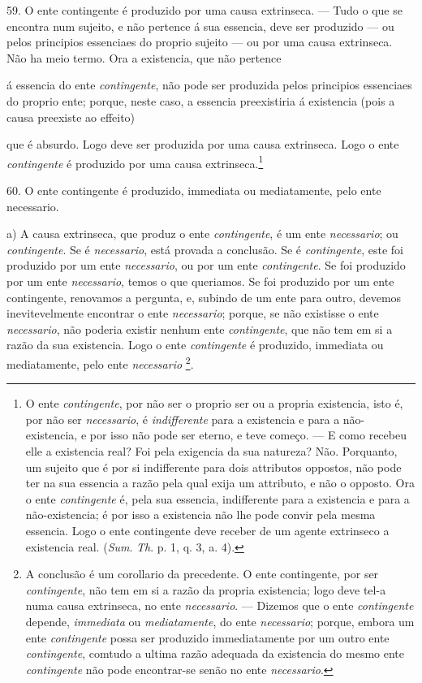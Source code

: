 59. O ente contingente é produzido por uma causa extrinseca. --- Tudo o que se encontra num sujeito, e não pertence á sua essencia, deve ser produzido --- ou pelos principios essenciaes do proprio sujeito --- ou por uma causa extrinseca. Não ha meio termo. Ora a existencia, que não pertence

á essencia do ente \emph{contingente}, não pode ser produzida pelos principios essenciaes do proprio ente; porque, neste caso, a essencia preexistiria á existencia (pois a causa preexiste ao effeito)

que é absurdo. Logo deve ser produzida por uma causa extrinseca. Logo o ente \emph{contingente} é produzido por uma causa extrinseca.\footnote{O ente \emph{contingente}, por não ser o proprio ser ou a propria existencia, isto é, por não ser \emph{necessario}, é \emph{indifferente} para a existencia e para a não-existencia, e por isso não pode ser eterno, e teve começo. --- E como recebeu elle a existencia real? Foi pela exigencia da sua natureza? Não. Porquanto, um sujeito que é por si indifferente para dois attributos oppostos, não pode ter na sua essencia a razão pela qual exija um attributo, e não o opposto. Ora o ente \emph{contingente} é, pela sua essencia, indifferente para a existencia e para a não-existencia; é por isso a existencia não lhe pode convir pela mesma essencia. Logo o ente contingente deve receber de um agente extrinseco a existencia real. (\emph{Sum}. \emph{Th}. p. 1, q. 3, a. 4).}

 60. O ente contingente é produzido, immediata ou mediatamente, pelo ente necessario.

a) A causa extrinseca, que produz o ente \emph{contingente}, é um ente \emph{necessario}; ou \emph{contingente}. Se é \emph{necessario}, está provada a conclusão. Se é \emph{contingente}, este foi produzido por um ente \emph{necessario}, ou por um ente \emph{contingente}. Se foi produzido por um ente \emph{necessario}, temos o que queriamos. Se foi produzido por um ente contingente, renovamos a pergunta, e, subindo de um ente para outro, devemos inevitevelmente encontrar o ente \emph{necessario}; porque, se não existisse o ente \emph{necessario}, não poderia existir nenhum ente \emph{contingente}, que não tem em si a razão da sua existencia. Logo o ente \emph{contingente} é produzido, immediata ou mediatamente, pelo ente \emph{necessario} \footnote{A conclusão é um corollario da precedente. O ente contingente, por ser \emph{contingente}, não tem em si a razão da propria existencia; logo deve tel-a numa causa extrinseca, no ente \emph{necessario}. --- Dizemos que o ente \emph{contingente} depende, \emph{immediata} ou \emph{mediatamente}, do ente \emph{necessario}; porque, embora um ente \emph{contingente} possa ser produzido immediatamente por um outro ente \emph{contingente}, comtudo a ultima razão adequada da existencia do mesmo ente \emph{contingente} não pode encontrar-se senão no ente \emph{necessario}.}.

